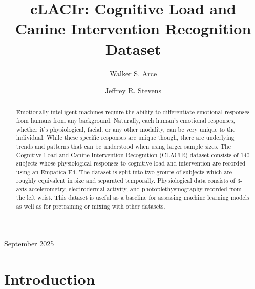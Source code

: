 \documentclass[12pt]{iopart}
\begin{document}
\title[cLACIr: Cognitive Load and Canine Intervention Recognition Dataset]{cLACIr: Cognitive Load and Canine Intervention Recognition Dataset}

\author{Walker S. Arce}
\address{University of Nebraska-Lincoln, Department of Electrical and Computer Engineering, Lincoln, 68588, United States}
\vspace{10pt}

\author{Jeffrey R. Stevens}
\address{University of Nebraska-Lincoln, Department of Psychology, Lincoln, 68588, United States}
\vspace{10pt}
\begin{indented}
\item[]September 2025
\end{indented}

\begin{abstract}
Emotionally intelligent machines require the ability to differentiate emotional responses from humans from any background.  Naturally, each human's emotional responses, whether it's physiological, facial, or any other modality, can be very unique to the individual.  While these specific responses are unique though, there are underlying trends and patterns that can be understood when using larger sample sizes.  The Cognitive Load and Canine Intervention Recognition (CLACIR) dataset consists of 140 subjects whose physiological responses to cognitive load and intervention are recorded using an Empatica E4.  The dataset is split into two groups of subjects which are roughly equivalent in size and separated temporally.  Physiological data consists of 3-axis accelerometry, electrodermal activity, and photoplethysmography recorded from the left wrist.  This dataset is useful as a baseline for assessing machine learning models as well as for pretraining or mixing with other datasets.
\end{abstract}

%
%
%
% 
%
\section*{Introduction}
\end{document}
